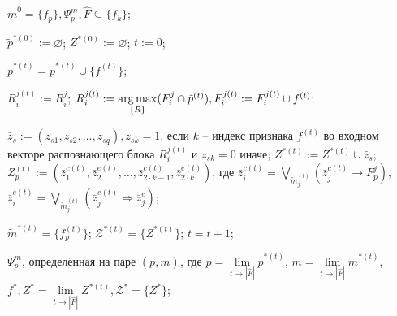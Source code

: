 	\Require $\tilde m^0=\{f_p\}, \Psi_p^m, \hat F\subseteq \{f_k\}$;
	
	\State $\tilde p^{*(0)} := \varnothing$;
	\State $Z^{*(0)} := \varnothing$;
	\State $t := 0$;
	
			\State $\tilde p^{*(t)}=\tilde p^{*(t)}\cup\{f^{(t)}\}$;
	
				\State $R_i^{j(t)}:=R_i^j$;
			\Else
				\State $R_i^{j(t)}:=\operatorname*{arg\,max}\limits_{\{R\}} (F_i^j\cap\tilde p^{(t)}), F_i^{j(t)}:=F_i^{j(t)}\cup f^{(t)}$;
			\EndIf
	
			\State $\bar z_s:=(z_{s1},z_{s2},\dots,z_{sq}), z_{sk}=1$, если $k$ -- индекс признака $f^{(t)}$ во входном векторе распознающего блока $R_i^{j(t)}$ и $z_{sk}=0$ иначе;
			\State $Z^{*(t)}:=Z^{*(t)}\cup\bar z_s$;
			\State $Z_p^{(t)}:=(\bar z_1^{c(t)},\bar z_2^{e(t)},\dots,\bar z_{2\cdot k-1}^{c(t)},\bar z_{2\cdot k}^{e(t)})$, где $\bar z_i^{c(t)}=\bigvee\limits_{\tilde m_j^{(t)}}(\bar z_j^{c(t)}\rightarrow F_p^j),$ 
	\\\hspace{3.0cm}$\bar z_i^{e(t)}=\bigvee\limits_{\tilde m_j^{(t)}}(\bar z_j^{e(t)}\Rightarrow\bar z_j^e)$;
		\EndIf
	
		\State $\tilde m^{*(t)}=\{f_p^{(t)}\}$;
		\State $\mathcal Z^{*(t)}=\{Z^{*(t)}\}$;
		\State $t=t+1$;
	\EndFor
	
	\Return $\Psi_p^m$, определённая на паре $(\tilde p, \tilde m)$, где $\tilde p=\lim\limits_{t\rightarrow|\hat F|}\tilde p^{*(t)}$, $\tilde m=\lim\limits_{t\rightarrow|\hat F|}\tilde m^{*(t)}$, $f^*, Z^*=\lim\limits_{t\rightarrow|\hat F|}Z^{*(t)},\mathcal Z^*=\{Z^*\}$;